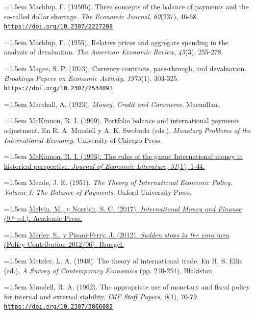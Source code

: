 \documentclass[10pt,a4paper]{article}
\begin{document}
\noindent\hangindent=1.5em Machlup, F. (1950b). Three concepts of the balance of payments and the so-called dollar shortage. \textit{The Economic Journal}, \textit{60}(237), 46-68. \href{https://doi.org/10.2307/2227208}{\nolinkurl{https://doi.org/10.2307/2227208}}

\noindent\hangindent=1.5em Machlup, F. (1955). Relative prices and aggregate spending in the analysis of devaluation. \textit{The American Economic Review}, \textit{45}(3), 255-278.

\noindent\hangindent=1.5em Magee, S. P. (1973). Currency contracts, pass-through, and devaluation. \textit{Brookings Papers on Economic Activity}, \textit{1973}(1), 303-325. \href{https://doi.org/10.2307/2534091}{\nolinkurl{https://doi.org/10.2307/2534091}}

\noindent\hangindent=1.5em Marshall, A. (1923). \textit{Money, Credit and Commerce}. Macmillan.

\noindent\hangindent=1.5em McKinnon, R. I. (1969). Portfolio balance and international payments adjustment. En R. A. Mundell y A. K. Swoboda (eds.), \textit{Monetary Problems of the International Economy}. University of Chicago Press.

\noindent\hangindent=1.5em \href{https://ideas.repec.org/a/aea/jeclit/v31y1993i1p1-44.html}{McKinnon, R. I. (1993). The rules of the game: International money in historical perspective. \textit{Journal of Economic Literature}, \textit{31}(1), 1-44.}

\noindent\hangindent=1.5em Meade, J. E. (1951). \textit{The Theory of International Economic Policy, Volume I: The Balance of Payments}. Oxford University Press.

\noindent\hangindent=1.5em \href{https://www.sciencedirect.com/book/9780128041062/international-money-and-finance}{Melvin, M., y Norrbin, S. C. (2017). \textit{International Money and Finance} (9.ª ed.). Academic Press.}

\noindent\hangindent=1.5em \href{https://www.bruegel.org/policy-brief/sudden-stops-euro-area}{Merler, S., y Pisani-Ferry, J. (2012). \textit{Sudden stops in the euro area} (Policy Contribution 2012/06). Bruegel.}

\noindent\hangindent=1.5em Metzler, L. A. (1948). The theory of international trade. En H. S. Ellis (ed.), \textit{A Survey of Contemporary Economics} (pp. 210-254). Blakiston.

\noindent\hangindent=1.5em Mundell, R. A. (1962). The appropriate use of monetary and fiscal policy for internal and external stability. \textit{IMF Staff Papers}, \textit{9}(1), 70-79. \href{https://doi.org/10.2307/3866082}{\nolinkurl{https://doi.org/10.2307/3866082}}
\end{document}
